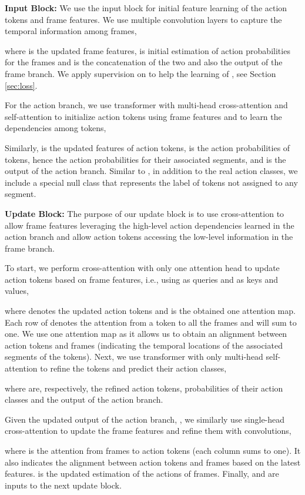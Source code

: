 \documentclass[10pt,twocolumn,letterpaper]{article}
\newcommand{\headline}[1]{\noindent \textbf{#1}}
\newcommand{\0}{\boldsymbol{0}}
\begin{document}
\headline{Input Block:} We use the input block for initial feature learning of the action tokens and frame features.
We use multiple convolution layers to capture the temporal information among frames,

where  is the updated frame features,  is initial estimation of action probabilities for the frames and  is the concatenation of the two and also the output of the frame branch. 
We apply supervision on  to help the learning of , see Section \ref{sec:loss}. 

For the action branch, we use transformer with multi-head cross-attention and self-attention to initialize action tokens using frame features  and to learn the dependencies among tokens,

Similarly,  is the updated features of action tokens,  is the action probabilities of tokens, hence the action probabilities for their associated segments, and  is the output of the action branch. Similar to \cite{Carion:CoRR20}, in addition to the  real action classes, we include a special null class that represents the label of tokens not assigned to any segment. 


\headline{Update Block:} 
The purpose of our update block is to use cross-attention to allow frame features leveraging the high-level action dependencies learned in the action branch and allow action tokens accessing the low-level information in the frame branch. 

To start, we perform cross-attention with only one attention head to update action tokens based on frame features, i.e., using  as queries and  as keys and values,

where  denotes the updated action tokens and  is the obtained one attention map. Each row of  denotes the attention from a token to all the frames and will sum to one.
We use one attention map as it allows us to obtain an alignment between action tokens and frames (indicating the temporal locations of the associated segments of the tokens). Next, we use transformer with only multi-head self-attention to refine the tokens and predict their action classes, 

where  are, respectively, the refined action tokens, probabilities of their action classes and the output of the action branch.


Given the updated output of the action branch, , we similarly use single-head cross-attention to update the frame features and refine them with convolutions, 

where  is the attention from frames to action tokens (each column sums to one). It also indicates the alignment between action tokens and frames based on the latest features. 
 is the updated estimation of the actions of frames. 
Finally,  and  are inputs to the next update block.
\end{document}
